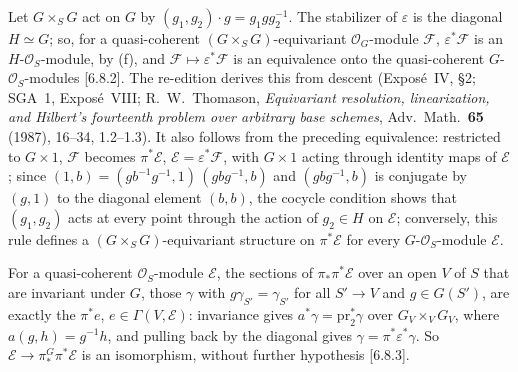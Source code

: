 Let \(G\times_SG\) act on \(G\) by
\((g_1,g_2)\cdot g=g_1gg_2^{-1}\). The stabilizer of \(\varepsilon\) is the
diagonal \(H\simeq G\); so, for a quasi-coherent
\((G\times_SG)\)-equivariant \(\mathcal O_G\)-module \(\mathscr F\),
\(\varepsilon^*\mathscr F\) is an \(H\)-\(\mathcal O_S\)-module, by (f), and
\(\mathscr F\mapsto\varepsilon^*\mathscr F\) is an equivalence onto the
quasi-coherent \(G\)-\(\mathcal O_S\)-modules [6.8.2]. The re-edition
derives this from descent (Exposé~IV, \S2; SGA~1, Exposé~VIII;
R.~W.~Thomason, \textit{Equivariant resolution, linearization, and
Hilbert's fourteenth problem over arbitrary base schemes}, Adv.\ Math.\
\textbf{65} (1987), 16--34, 1.2--1.3). It also follows from the preceding
equivalence: restricted to \(G\times1\), \(\mathscr F\) becomes
\(\pi^*\mathscr E\), \(\mathscr E=\varepsilon^*\mathscr F\), with
\(G\times1\) acting through identity maps of \(\mathscr E\); since
\((1,b)=(gb^{-1}g^{-1},1)\,(gbg^{-1},b)\) and \((gbg^{-1},b)\) is conjugate
by \((g,1)\) to the diagonal element \((b,b)\), the cocycle condition shows
that \((g_1,g_2)\) acts at every point through the action of
\(g_2\in H\) on \(\mathscr E\); conversely, this rule defines a
\((G\times_SG)\)-equivariant structure on \(\pi^*\mathscr E\) for every
\(G\)-\(\mathcal O_S\)-module \(\mathscr E\).

For a quasi-coherent
\(\mathcal O_S\)-module \(\mathscr E\), the sections of
\(\pi_*\pi^*\mathscr E\) over an open \(V\) of \(S\) that are invariant
under \(G\), those \(\gamma\) with \(g\gamma_{S'}=\gamma_{S'}\) for all
\(S'\to V\) and \(g\in G(S')\), are exactly the \(\pi^*e\),
\(e\in\Gamma(V,\mathscr E)\): invariance gives
\(a^*\gamma=\mathrm{pr}_2^*\gamma\) over \(G_V\times_VG_V\), where
\(a(g,h)=g^{-1}h\), and pulling back by the diagonal gives
\(\gamma=\pi^*\varepsilon^*\gamma\). So
\(\mathscr E\to\pi_*^G\pi^*\mathscr E\) is an isomorphism, without
further hypothesis [6.8.3].


